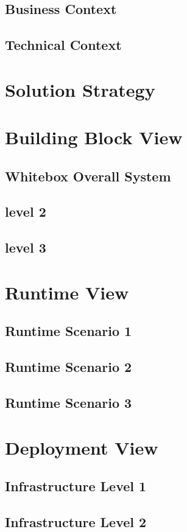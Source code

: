 \documentclass[a4paper]{paper}
\begin{document}
\subsection{Business Context}
\subsection{Technical Context}
\newpage\section{Solution Strategy}
\newpage\section{Building Block View}
\subsection{Whitebox Overall System}
\subsection{level 2}
\subsection{level 3}
\section{Runtime View}
\subsection{Runtime Scenario 1}
\subsection{Runtime Scenario 2}
\subsection{Runtime Scenario 3}
\newpage\section{Deployment View}
\subsection{Infrastructure Level 1}
\subsection{Infrastructure Level 2}
\end{document}
